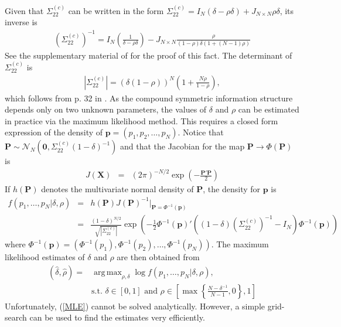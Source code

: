 \documentclass[11pt,twoside]{article}
\DeclareMathOperator*{\argmax}{arg\,max}
\theoremstyle{definition}
\theoremstyle{definition}
\begin{document}
Given that $\Sigma_{22}^{(c)}$ can be written in the form  $\Sigma_{22}^{(c)} = I_N (\delta-\rho\delta) + J_{N \times N} \rho\delta$, its inverse is
\begin{align}
\left(\Sigma_{22}^{(c)}\right)^{-1} = I_N \left(\frac{1}{\delta-\rho\delta} \right) - J_{N \times N} \frac{\rho}{(1-\rho)\delta(1+(N-1) \rho)} \label{inverse}
\end{align}
See the supplementary material of \cite{dobbin2005sample} for the proof of this fact.  The determinant of $\Sigma_{22}^{(c)}$ is
\begin{align}
| \Sigma_{22}^{(c)}| = (\delta(1- \rho))^N \left(1+\frac{N \rho}{1 - \rho} \right),\label{determinant}
\end{align}
which follows from p. 32 in \cite{rao2009linear}. As the compound symmetric information structure depends only on two unknown parameters, the values of $\delta$ and $\rho$ can be estimated in practice via the maximum likelihood method. This requires a closed form expression of the density of $\boldsymbol{p} = (p_1, p_2, \dots, p_N)$. Notice that $\boldsymbol{P} \sim \mathcal{N}_N\left(\boldsymbol{0}, \Sigma_{22}^{(c)} (1-\delta)^{-1}\right)$ and that the Jacobian for the map $\boldsymbol{P} \to \Phi\left(\boldsymbol{P}\right)$ is
\begin{eqnarray*}
J(\boldsymbol{X}) &=& (2\pi)^{-N/2} \exp \left( - \frac{\boldsymbol{P}' \boldsymbol{P}}{2}   \right) 
\end{eqnarray*}
If $h(\boldsymbol{P})$ denotes the multivariate normal density of $\boldsymbol{P}$,  
the density for $\boldsymbol{p}$ is 
\begin{eqnarray*}
 f\left(p_1, \dots, p_N | \delta, \rho \right) &=& h(\boldsymbol{P}) J(\boldsymbol{P})^{-1} \bigg|_{\boldsymbol{P} = \Phi^{-1}(\boldsymbol{p})}\\
&=& \frac{(1-\delta)^{N/2}}{\sqrt{ |\Sigma_{22}^{(c)}|}} \exp\left( -\frac{1}{2} \Phi^{-1}(\boldsymbol{p})' \left( (1-\delta) \left(\Sigma_{22}^{(c)}\right)^{-1} - I_N \right) \Phi^{-1}(\boldsymbol{p})  \right) 
\end{eqnarray*}
where $\Phi^{-1}(\boldsymbol{p}) =  (\Phi^{-1}(p_1), \Phi^{-1}(p_2), \dots, \Phi^{-1}(p_N))$. The maximum likelihood estimates of $\delta$ and $\rho$ are then obtained from
\begin{align}
(\hat{\delta}, \hat{\rho}) =& \argmax_{\rho, \delta} \log  f\left(p_1, \dots, p_N | \delta, \rho \right), \label{MLE}\\
& \text{s.t. } \nonumber \delta \in [0,1] \text{ and } \rho \in \left[  \max \left\{ \frac{N-\delta^{-1}}{N-1}, 0\right\}, 1 \right]
\end{align}
Unfortunately, (\ref{MLE}) cannot be solved analytically. However, a simple grid-search can be used to find the estimates very efficiently. 
\end{document}

